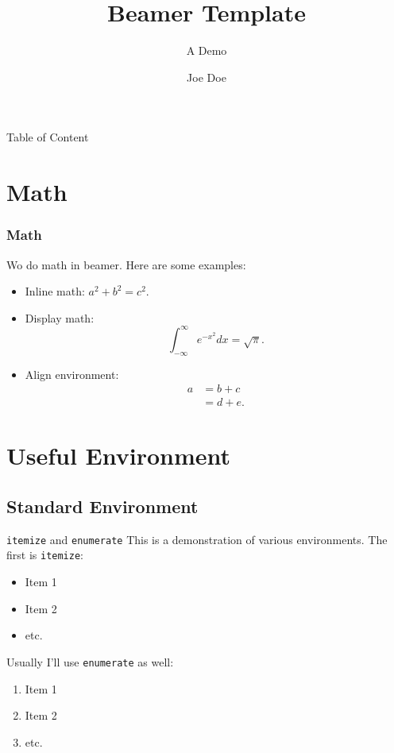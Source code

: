 \documentclass[aspectratio=169, xcolor={dvipsnames}, hyperref={colorlinks=true,linkcolor=themecolor, urlcolor=magenta,citecolor=violet, hyperfootnotes=true}]{beamer}
\title{Beamer Template}
\subtitle{A Demo}
\institute[UD]{University of Delaware}
\author{Joe Doe}
\begin{document}
\begin{frame}
    \titlepage
\end{frame}

\begin{frame}{Table of Content}
    \tableofcontents[hideallsubsections]
\end{frame}

\section{Math}
\begin{frame}
    \frametitle{Math}
    Wo do math in beamer. Here are some examples:
    \begin{itemize}
        \item Inline math: $a^2 + b^2 = c^2$.
        \item Display math:
              \begin{equation}
                  \int_{-\infty}^{\infty} e^{-x^2} dx = \sqrt{\pi}.
              \end{equation}
        \item Align environment:
              \begin{align}
                  a & = b + c \\
                  & = d + e.
              \end{align}
    \end{itemize}
\end{frame}


\section{Useful Environment}
\subsection{Standard Environment}
\begin{frame}{\texttt{itemize} and \texttt{enumerate}}
    This is a demonstration of various environments. The first is \texttt{itemize}:

    \begin{itemize}
        \item Item 1
        \item Item 2
        \item etc.
    \end{itemize}

    Usually I'll use \texttt{enumerate} as well:

    \begin{enumerate}
        \item Item 1
        \item Item 2
        \item etc.
    \end{enumerate}
\end{frame}
\end{document}
